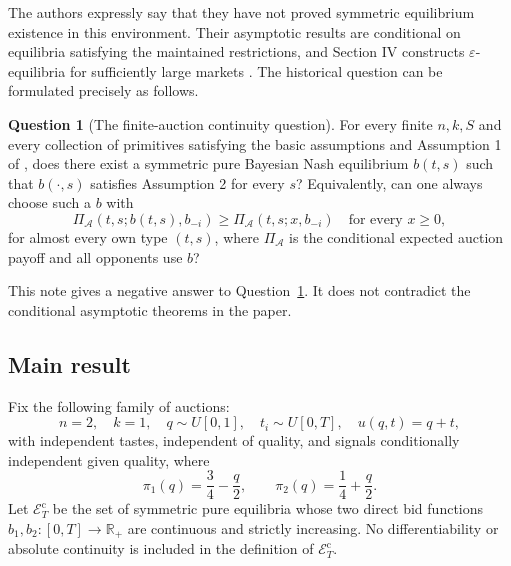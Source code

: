 \documentclass[11pt,a4paper]{article}
\numberwithin{equation}{section}
\theoremstyle{definition}
\newtheorem{question}[theorem]{Question}
\theoremstyle{remark}
\newcommand{\R}{\mathbb R}
\newcommand{\Ec}{\mathcal E_T^{\mathrm{c}}}
\begin{document}
The authors expressly say that they have not proved symmetric equilibrium existence in this environment. Their asymptotic results are conditional on equilibria satisfying the maintained restrictions, and Section IV constructs $\varepsilon$-equilibria for sufficiently large markets \cite[pp.~501, 505, 510--511]{PS2000}. The historical question can be formulated precisely as follows.

\begin{question}[The finite-auction continuity question]
\label{q:historical}
For every finite $n,k,S$ and every collection of primitives satisfying the basic assumptions and Assumption 1 of \cite{PS2000}, does there exist a symmetric pure Bayesian Nash equilibrium $b(t,s)$ such that $b(\cdot,s)$ satisfies Assumption 2 for every $s$?
Equivalently, can one always choose such a $b$ with
\[
\Pi_{\mathcal A}(t,s;b(t,s),b_{-i})
\ge \Pi_{\mathcal A}(t,s;x,b_{-i})
\quad\text{for every }x\ge0,
\]
for almost every own type $(t,s)$, where $\Pi_{\mathcal A}$ is the conditional expected auction payoff and all opponents use $b$?
\end{question}

This note gives a negative answer to Question~\ref{q:historical}. It does not contradict the conditional asymptotic theorems in the paper.

\subsection{Main result}
Fix the following family of auctions:
\begin{equation}
\label{eq:primitives}
n=2,\quad k=1,\quad q\sim U[0,1],\quad
 t_i\sim U[0,T],\quad u(q,t)=q+t,
\end{equation}
with independent tastes, independent of quality, and signals conditionally independent given quality, where
\begin{equation}
\label{eq:signals}
\pi_1(q)=\frac34-\frac q2,
\qquad
\pi_2(q)=\frac14+\frac q2.
\end{equation}
Let $\Ec$ be the set of symmetric pure equilibria whose two direct bid functions $b_1,b_2:[0,T]\to\R_+$ are continuous and strictly increasing. No differentiability or absolute continuity is included in the definition of $\Ec$.
\end{document}
